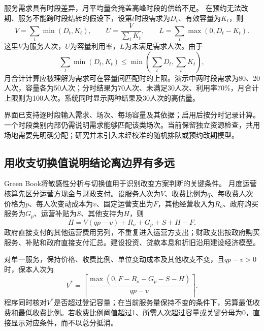 服务需求具有时段差异，月平均量会掩盖高峰时段的供给不足。\cite{green2007} 在预约无法改期、服务不能跨时段结转的假设下，设第$t$时段需求为$D_t$、有效容量为$K_t$，则
\begin{equation}
 V=\sum_t\min(D_t,K_t),\qquad
 U=\frac{V}{\sum_tK_t},\qquad
 L=\sum_t\max(0,D_t-K_t).
\end{equation}
这里$V$为服务人次，$U$为容量利用率，$L$为未满足需求人次。由于
\begin{equation}
 \sum_t\min(D_t,K_t)\leq\min\!\left(\sum_tD_t,\sum_tK_t\right),
\end{equation}
月合计计算应被理解为需求可在容量间匹配时的上限。演示中两时段需求为80、20人次，容量各为50人次；分时结果为70人次、未满足30人次、利用率70\%，月合计上限则为100人次。系统同时显示两种结果及30人次的高估量。

界面已支持逐时段输入需求、场次、每场容量及其依据；启用后按分时记录计算。一个时段类别内部仍需说明需求能够匹配该类场次。当前保留独立资源检查，共用场地需要先明确分配；研究并未引入未经校准的随机排队或预约改期模型。

\subsection{用收支切换值说明结论离边界有多远}

Green Book将敏感性分析与切换值用于识别改变方案判断的关键条件。\cite{greenbook2026} 月度运营核算先区分运营方现金与财政支付。设服务人次为$V$、收费比例为$q$、每收费人次价格为$p$、每人次变动成本为$v$、固定运营支出为$F$，其他经营收入为$R_o$、政府购买服务为$G_p$、运营补贴为$S$、其他支持为$H$，则
\begin{equation}
 \Pi=V(qp-v)+R_o+G_p+S+H-F.
\end{equation}
政府直接支付的其他运营费用另列，不重复进入运营方支出；财政支出按政府购买服务、补贴和政府直接支付汇总。建设投资、贷款本息和折旧沿用建设经济模型。

对单一服务，保持价格、收费比例、单位变动成本及其他收支不变，且$qp-v>0$时，保本人次为
\begin{equation}
 V^*=\left\lceil\frac{\max(0,F-R_o-G_p-S-H)}{qp-v}\right\rceil.
\end{equation}
程序同时核对$V^*$是否超过登记容量；在当前服务量保持不变的条件下，另算最低收费和最低收费比例。若收费比例阈值超过1、所需人次超过容量或关键分母为0，直接显示对应条件，而不以总分抵消。

